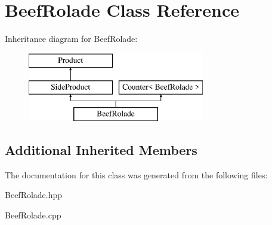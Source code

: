 \hypertarget{class_beef_rolade}{}\section{Beef\+Rolade Class Reference}
\label{class_beef_rolade}
Inheritance diagram for Beef\+Rolade\+:\begin{figure}[H]
\begin{center}
\leavevmode
\includegraphics[height=3.000000cm]{class_beef_rolade}
\end{center}
\end{figure}
\subsection*{Additional Inherited Members}


The documentation for this class was generated from the following files\+:\begin{DoxyCompactItemize}
\item 
Beef\+Rolade.\+hpp\item 
Beef\+Rolade.\+cpp\end{DoxyCompactItemize}

